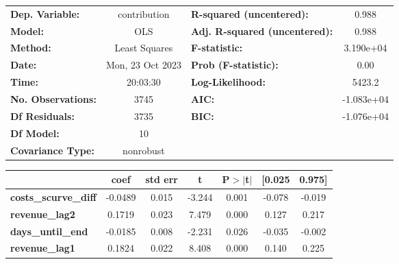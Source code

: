 \begin{center}
\begin{tabular}{lclc}
\toprule
\textbf{Dep. Variable:}                   &   contribution   & \textbf{  R-squared (uncentered):}      &     0.988   \\
\textbf{Model:}                           &       OLS        & \textbf{  Adj. R-squared (uncentered):} &     0.988   \\
\textbf{Method:}                          &  Least Squares   & \textbf{  F-statistic:       }          & 3.190e+04   \\
\textbf{Date:}                            & Mon, 23 Oct 2023 & \textbf{  Prob (F-statistic):}          &     0.00    \\
\textbf{Time:}                            &     20:03:30     & \textbf{  Log-Likelihood:    }          &    5423.2   \\
\textbf{No. Observations:}                &        3745      & \textbf{  AIC:               }          & -1.083e+04  \\
\textbf{Df Residuals:}                    &        3735      & \textbf{  BIC:               }          & -1.076e+04  \\
\textbf{Df Model:}                        &          10      & \textbf{                     }          &             \\
\textbf{Covariance Type:}                 &    nonrobust     & \textbf{                     }          &             \\
\bottomrule
\end{tabular}
\begin{tabular}{lcccccc}
                                          & \textbf{coef} & \textbf{std err} & \textbf{t} & \textbf{P$> |$t$|$} & \textbf{[0.025} & \textbf{0.975]}  \\
\midrule
\textbf{costs\_scurve\_diff}              &      -0.0489  &        0.015     &    -3.244  &         0.001        &       -0.078    &       -0.019     \\
\textbf{revenue\_lag2}                    &       0.1719  &        0.023     &     7.479  &         0.000        &        0.127    &        0.217     \\
\textbf{days\_until\_end}                 &      -0.0185  &        0.008     &    -2.231  &         0.026        &       -0.035    &       -0.002     \\
\textbf{revenue\_lag1}                    &       0.1824  &        0.022     &     8.408  &         0.000        &        0.140    &        0.225     \\

\end{tabular}
\end{center}
